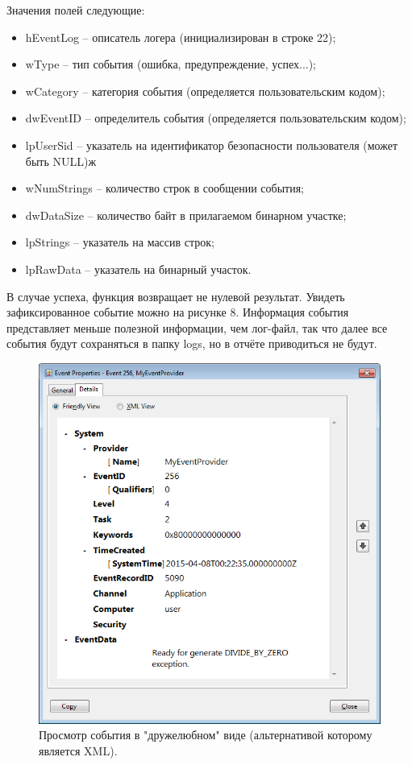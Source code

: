 \documentclass[a4paper, 12pt]{report}		%
\begin{document}
Значения полей следующие:
\begin{itemize}
\item hEventLog -- описатель логера (инициализирован в строке 22);
\item wType -- тип события (ошибка, предупреждение, успех...);
\item wCategory -- категория события (определяется пользовательским кодом);
\item dwEventID -- определитель события (определяется пользовательским кодом);
\item lpUserSid -- указатель на идентификатор безопасности пользователя (может быть NULL)ж
\item wNumStrings -- количество строк в сообщении события;
\item dwDataSize -- количество байт в прилагаемом бинарном участке;
\item lpStrings -- указатель на массив строк;
\item lpRawData -- указатель на бинарный участок.
\end{itemize}

В случае успеха, функция возвращает не нулевой результат. Увидеть зафиксированное событие можно на рисунке 8. Информация события представляет меньше полезной информации, чем лог-файл, так что далее все события будут сохраняться в папку logs, но в отчёте приводиться не будут.

\begin{figure}[h!]
\centering
\includegraphics[scale=0.8]{res/event}
\caption{Просмотр события в "дружелюбном" виде (альтернативой которому является XML).}
\end{figure}
\end{document}
